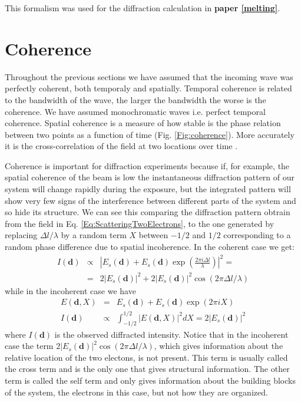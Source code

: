 This formalism was used for the diffraction calculation in {\bf paper \ref{melting}}.

\section{Coherence}\label{coherence}

Throughout the previous sections we have assumed that the incoming wave was
perfectly coherent, both temporaly and spatially. Temporal coherence is related
to the bandwidth of the wave, the larger the bandwidth the worse is the
coherence. We have assumed monochromatic waves i.e. perfect temporal
coherence. Spatial coherence is a measure of how stable is the phase relation between
two points as a function of time (Fig. \ref{Fig:coherence}). More accurately it is the cross-correlation of the field at two locations over time \cite{Attwood2007Soft}. 

Coherence is important for diffraction experiments \cite{HauRiege2008Effect} because if, for example, the
spatial coherence of the beam is low the instantaneous diffraction pattern of
our system will change rapidly during the exposure, but the integrated pattern
will show very few signs of the interference between different parts of the
system and so hide its structure. We can see this comparing the diffraction
pattern obtrain from the field in Eq. \ref{Eq:ScatteringTwoElectrons}, to the
one generated by replacing $\Delta l/\lambda$ by a random term $X$
between $-1/2$ and $1/2$ corresponding to a random phase difference due to
spatial incoherence. In the coherent case we get:
\begin{eqnarray}
  I(\mathbf d)  & \propto & |E_s(\mathbf d) + E_s(\mathbf d) \exp(\frac{2 \pi i \Delta
    l}{\lambda})|^2  = \nonumber \\
 & = & 2 |E_s(\mathbf d)|^2 + 2 |E_s(\mathbf d)|^2
  \cos(2 \pi \Delta l / \lambda)
\end{eqnarray}
 while in the incoherent case we have
\begin{eqnarray}
 E(\mathbf d,X) & = &  E_s(\mathbf d) + E_s(\mathbf d) \exp(2 \pi i X) \nonumber
 \\
I(\mathbf d)  & \propto & \int_{-1/2}^{1/2} |E(\mathbf d,X)|^2 dX = 2 |E_s(\mathbf d)|^2
\end{eqnarray}
where $I(\mathbf d)$ is the observed diffracted intensity. Notice that in the
incoherent case the term $2 |E_s(\mathbf d)|^2 \cos(2 \pi \Delta l / \lambda)$,
which gives information about the relative location of the two electons, is not
present. This term is usually called the cross term and is the only one that
gives structural information. The other term is called the self term and only gives
information about the building blocks of the system, the electrons in this case,
but not how they are organized.


